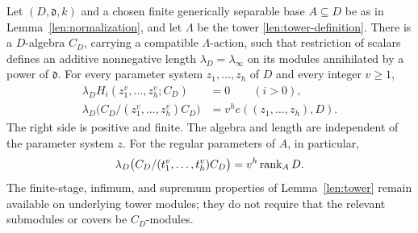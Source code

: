 \begin{theorem}\label{len:input}
Let $(D,\mathfrak d,k)$ and a chosen finite generically separable base
$A\subseteq D$ be as in Lemma~\ref{len:normalization}, and let
$\Lambda$ be the tower \eqref{len:tower-definition}.  There is a
$D$-algebra $C_D$, carrying a compatible $\Lambda$-action, such that
restriction of scalars defines an additive nonnegative length
$\lambda_D=\lambda_\infty$ on its modules annihilated by a power of
$\mathfrak d$.  For every parameter system $z_1,\ldots,z_h$ of $D$
and every integer $v\geq1$,
\begin{align}
 \lambda_D H_i(z_1^v,\ldots,z_h^v;C_D)&=0\qquad(i>0),
                                      \label{len:koszul-vanishing}\\
 \lambda_D\bigl(C_D/(z_1^v,\ldots,z_h^v)C_D\bigr)
                    &=v^h e((z_1,\ldots,z_h),D).
                                      \label{len:parameter-length}
\end{align}
The right side is positive and finite.  The algebra and length are
independent of the parameter system $z$.
For the regular parameters of $A$, in particular,
\begin{equation}\label{len:base-parameter-length}
 \lambda_D\bigl(C_D/(t_1^v,\ldots,t_h^v)C_D\bigr)
                         =v^h\operatorname{rank}_A D.
\end{equation}
The finite-stage, infimum, and supremum properties of
Lemma~\ref{len:tower} remain available on underlying tower modules;
they do not require that the relevant submodules or covers be
$C_D$-modules.
\end{theorem}

